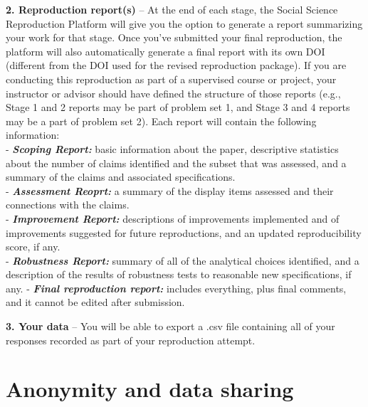 \documentclass[
]{book}
\begin{document}
\textbf{2. Reproduction report(s)} -- At the end of each stage, the Social Science Reproduction Platform will give you the option to generate a report summarizing your work for that stage. Once you've submitted your final reproduction, the platform will also automatically generate a final report with its own DOI (different from the DOI used for the revised reproduction package). If you are conducting this reproduction as part of a supervised course or project, your instructor or advisor should have defined the structure of those reports (e.g., Stage 1 and 2 reports may be part of problem set 1, and Stage 3 and 4 reports may be a part of problem set 2). Each report will contain the following information:\\
- \textbf{\emph{Scoping Report:}} basic information about the paper, descriptive statistics about the number of claims identified and the subset that was assessed, and a summary of the claims and associated specifications.\\
- \textbf{\emph{Assessment Reoprt:}} a summary of the display items assessed and their connections with the claims.\\
- \textbf{\emph{Improvement Report:}} descriptions of improvements implemented and of improvements suggested for future reproductions, and an updated reproducibility score, if any.\\
- \textbf{\emph{Robustness Report:}} summary of all of the analytical choices identified, and a description of the results of robustness tests to reasonable new specifications, if any.
- \textbf{\emph{Final reproduction report:}} includes everything, plus final comments, and it cannot be edited after submission.

\textbf{3. Your data} -- You will be able to export a .csv file containing all of your responses recorded as part of your reproduction attempt.

\hypertarget{anonymity-and-data-sharing}{%
\section{Anonymity and data sharing}\label{anonymity-and-data-sharing}}
\end{document}
